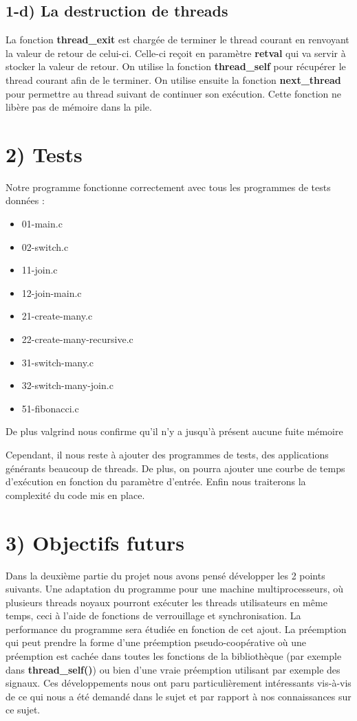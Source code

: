 \documentclass{report}
\begin{document}
\subsection*{1-d) La destruction de threads}
La fonction \textbf{thread\_exit} est chargée de terminer le thread courant en renvoyant la valeur de retour de celui-ci.
Celle-ci reçoit en paramètre \textbf{retval} qui va servir à stocker la valeur de retour. On utilise la fonction \textbf{thread\_self} pour récupérer le thread courant afin de le terminer.
On utilise ensuite la fonction \textbf{next\_thread} pour permettre au thread suivant de continuer son exécution.
Cette fonction ne libère pas de mémoire dans la pile.

\section*{2) Tests}

Notre programme fonctionne correctement avec tous les programmes de tests données : 
\begin{itemize}
\item 01-main.c
\item 02-switch.c	
\item 11-join.c	
\item 12-join-main.c	
\item 21-create-many.c	
\item 22-create-many-recursive.c	
\item 31-switch-many.c	
\item 32-switch-many-join.c	
\item 51-fibonacci.c	
\end{itemize}
De plus valgrind nous confirme qu'il n'y a jusqu'à présent aucune fuite mémoire

Cependant, il nous reste à ajouter des programmes de tests, des applications générants beaucoup de threads. De plus, on pourra ajouter une courbe de temps d'exécution en fonction du paramètre d'entrée.
Enfin nous traiterons la complexité du code mis en place.


\section*{3) Objectifs futurs}
Dans la deuxième partie du projet nous avons pensé développer les 2 points suivants.
Une adaptation du programme pour une machine multiprocesseurs, où plusieurs threads noyaux pourront exécuter les threads utilisateurs en même temps, ceci à l’aide de fonctions de verrouillage et synchronisation.
La performance du programme sera étudiée en fonction de cet ajout.
La préemption qui peut prendre la forme d’une préemption pseudo-coopérative où une préemption est cachée dans toutes les fonctions de la bibliothèque (par exemple dans \textbf{thread\_self()}) ou bien d’une vraie préemption utilisant par exemple des signaux.
Ces développements nous ont paru particulièrement intéressants vis-à-vis de ce qui nous a été demandé dans le sujet et par rapport à nos connaissances sur ce sujet.
\end{document}
